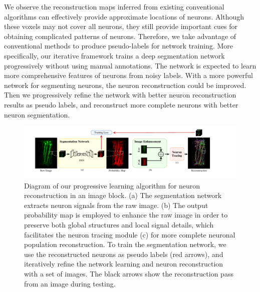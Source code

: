 We observe the reconstruction maps inferred from existing conventional algorithms can effectively provide approximate locations of neurons. Although these voxels may not cover all neurons, they still provide important cues for obtaining complicated patterns of neurons.
Therefore, we take advantage of conventional methods to produce pseudo-labels for network training.
More specifically, our iterative framework trains a deep segmentation network progressively without using manual annotations. The network is expected to learn more comprehensive features of neurons from noisy labels. With a more powerful network for segmenting neurons, the neuron reconstruction could be improved. Then we progressively refine the network with better neuron reconstruction results as pseudo labels, and reconstruct more complete neurons with better neuron segmentation.

\begin{figure}[th]
	\centering
	\includegraphics[width=1\textwidth]{./Illustrations/framework2.pdf}
	\caption{Diagram of our progressive learning algorithm for neuron reconstruction in an image block. (a) The segmentation network extracts neuron signals from the raw image. (b) The output probability map is employed to enhance the raw image in order to preserve both global structures and local signal details, which facilitates the neuron tracing module (c) for more complete neuronal population reconstruction. To train the segmentation network, we use the reconstructed neurons as pseudo labels (red arrows), and iteratively refine the network learning and neuron reconstruction with a set of images. The black arrows show the reconstruction pass from an image during testing.}
	\label{fig:framework}
\end{figure}

